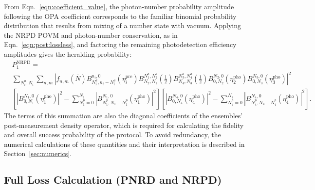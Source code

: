 \documentclass[aps,twocolumn,secnumarabic,amsmath,amssymb,pra,groupedaddress,
showpacs, showkeys]{revtex4-1}
\newcommand{\pna}[1]{\left(#1\right)}
\newcommand{\pnb}[1]{\left[#1\right]}
\newcommand{\abs}[1]{\left|#1\right|}
\begin{document}
From Eqn.~\ref{eqn:coefficient_value}, the photon-number probability amplitude
following the OPA coefficient corresponds to the familiar binomial probability
distribution that results from mixing of a number state with vacuum. Applying
the NRPD POVM and photon-number conservation, as in
Eqn.~\ref{eqn:post:lossless}, and factoring the remaining photodetection
efficiency amplitudes gives the heralding probability:
\begin{align}
	&P_{1}^{\textrm{NRPD}}= \nonumber \\
	& \sum_{N_i^a,N_i}\sum_{n,m}
	\left|f_{n,m}\pna{\bar{N}}
	B_{N_i^a,n_i-N_i^a}^{n_i,0}\pna{\eta_i^{\textrm{pre}}}
	B_{N_2,N_1}^{N_1^a,N_2^a}\pna{\frac{1}{2}}
	B_{N_4,N_3}^{N_3^a,N_4^a}\pna{\frac{1}{2}} 
	B_{0,N_2}^{N_2,0}\pna{\eta_2^{\textrm{pho}}} 
	B_{0,N_3}^{N_3,0}\pna{\eta_3^{\textrm{pho}}}\right|^2\nonumber \\
	&  \pnb{\abs{B_{0,N_1}^{N_1,0}\pna{\eta_1^{\textrm{pho}}}}^2-\sum_{N_1^p=0}^{N_1} \abs{B_{N_1^p,N_1-N_1^p}^{N_1,0}\pna{\eta_1^{\textrm{pho}}}}^2} \pnb{\abs{B_{0,N_4}^{N_4,0}\pna{\eta_4^{\textrm{pho}}}}^2-\sum_{N_4^p=0}^{N_4} \abs{B_{N_4^p,N_4-N_4^p}^{N_4,0}\pna{\eta_4^{\textrm{pho}}}}^2}.
\end{align}
The terms of this summation are also the diagonal coefficients of the
ensembles' post-measurement density operator, which is required for calculating
the fidelity and overall success probability of the protocol. To avoid
redundancy, the numerical calculations of these quantities and their
interpretation is described in Section~\ref{sec:numerics}. 

\subsection{Full Loss Calculation (PNRD and NRPD)~\label{sec:numerics}}
\end{document}
